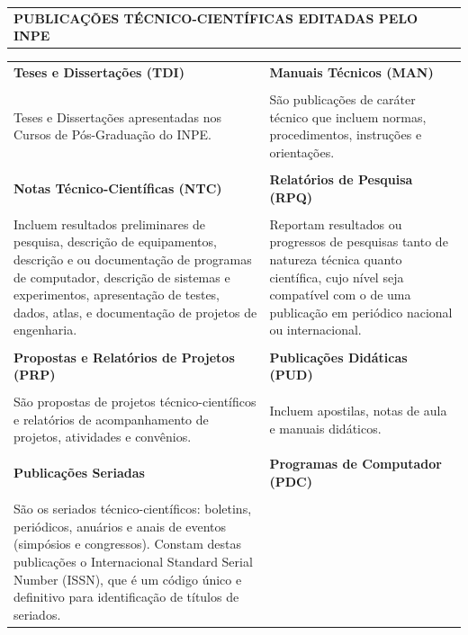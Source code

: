 \thispagestyle{empty}
 \begin{table}
  \begin{center}
  \begin{tabularx}{\textwidth}{X}
   \textbf{PUBLICAÇÕES TÉCNICO-CIENTÍFICAS EDITADAS PELO INPE}
  \end{tabularx}
  \end{center}
 \end{table}

 \begin{table}
  \begin{center}
  \begin{tabularx}{\textwidth}{X X}

  \textbf{Teses e Dissertações (TDI)}              & \textbf{Manuais Técnicos (MAN)}\\
\\
Teses e Dissertações apresentadas nos Cursos de Pós-Graduação do INPE.	&
São publicações de caráter técnico que incluem normas, procedimentos, instruções e orientações.\\
\\
\textbf{Notas Técnico-Científicas (NTC)}           & \textbf{Relatórios de Pesquisa (RPQ)}\\
\\
Incluem resultados preliminares de pesquisa, descrição de equipamentos, descrição e ou documentação de programas de computador, descrição de sistemas e experimentos, apresentação de testes, dados, atlas, e documentação de projetos de engenharia.
&
Reportam resultados ou progressos de pesquisas tanto de natureza técnica quanto científica, cujo nível seja compatível com o de uma publicação em periódico nacional ou internacional.\\
\\
\textbf{Propostas e Relatórios de Projetos (PRP)}	& \textbf{Publicações Didáticas (PUD)}
\\
\\
São propostas de projetos técnico-científicos e relatórios de acompanhamento de projetos, atividades e convênios.
&
Incluem apostilas, notas de aula e manuais didáticos. \\
\\
\textbf{Publicações Seriadas} 	& \textbf{Programas de Computador (PDC)}\\
\\
São os seriados técnico-científicos: boletins, periódicos, anuários e anais de eventos (simpósios e congressos). Constam destas publicações o Internacional Standard Serial Number (ISSN), que é um código único e definitivo para identificação de títulos de seriados.

\end{tabularx}
\end{center}
\end{table}
